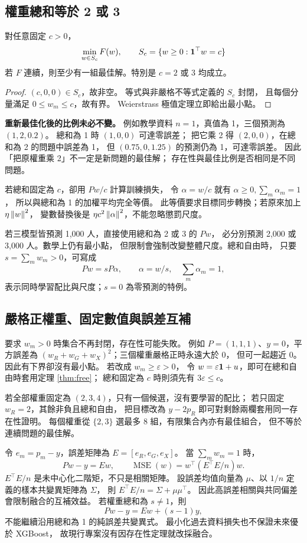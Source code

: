 \subsection{權重總和等於 2 或 3}
\begin{theorem}[固定正總和的存在性]\label{thm:sum}
對任意固定 $c>0$，
\[
\min_{w\in S_c}F(w),\qquad
S_c=\{w\ge0:\mathbf 1^\top w=c\}
\]
若 $F$ 連續，則至少有一組最佳解。特別是 $c=2$ 或 $3$ 均成立。
\end{theorem}
\begin{proof}
$(c,0,0)\in S_c$，故非空。
等式與非嚴格不等式定義的 $S_c$ 封閉，
且每個分量滿足 $0\le w_m\le c$，故有界。
Weierstrass 極值定理立即給出最小點。
\end{proof}

\textbf{重新最佳化後的比例未必不變。}
例如教學資料 $n=1$，真值為 1，三個預測為 $(1,2,0.2)$。
總和為 1 時 $(1,0,0)$ 可達零誤差；
把它乘 2 得 $(2,0,0)$，在總和為 2 的問題中誤差為 1，
但 $(0.75,0,1.25)$ 的預測仍為 1，可達零誤差。
因此「把原權重乘 2」不一定是新問題的最佳解；
存在性與最佳比例是否相同是不同問題。

若總和固定為 $c$，卻用 $Pw/c$ 計算訓練損失，
令 $\alpha=w/c$ 就有 $\alpha\ge0,\sum_m\alpha_m=1$，
所以與總和為 1 的加權平均完全等價。
此等價要求目標同步轉換；若原來加上 $\eta\left\lVert w\right\rVert^2$，
變數替換後是 $\eta c^2\left\lVert\alpha\right\rVert^2$，不能忽略懲罰尺度。

若三模型皆預測 1,000 人，直接使用總和為 2 或 3 的 $Pw$，
必分別預測 2,000 或 3,000 人。數學上仍有最小點，
但限制會強制改變整體尺度。總和自由時，
只要 $s=\sum_mw_m>0$，可寫成
\[
Pw=sP\alpha,\qquad \alpha=w/s,\quad\sum_m\alpha_m=1,
\]
表示同時學習配比與尺度；$s=0$ 為零預測的特例。

\subsection{嚴格正權重、固定數值與誤差互補}
要求 $w_m>0$ 時集合不再封閉，存在性可能失敗。
例如 $P=(1,1,1)$、$y=0$，平方誤差為
$(w_R+w_G+w_X)^2$；三個權重嚴格正時永遠大於 0，
但可一起趨近 0。因此有下界卻沒有最小點。
若改成 $w_m\ge\varepsilon>0$，
令 $w=\varepsilon\mathbf 1+u$，即可在總和自由時套用定理 \ref{thm:free}；
總和固定為 $c$ 時則須先有 $3\varepsilon\le c$。

若全部權重固定為 $(2,3,4)$，只有一個候選，沒有要學習的配比；
若只固定 $w_R=2$，其餘非負且總和自由，
把目標改為 $y-2p_R$ 即可對剩餘兩欄套用同一存在性證明。
每個權重從 $\{2,3\}$ 選最多 8 組，有限集合內亦有最佳組合，
但不等於連續問題的最佳解。

令 $e_m=p_m-y$，誤差矩陣為 $E=[e_R,e_G,e_X]$。
當 $\sum_mw_m=1$ 時，
\begin{equation}
Pw-y=Ew,\qquad
\operatorname{MSE}(w)=w^\top(E^\top E/n)w .
\end{equation}
$E^\top E/n$ 是未中心化二階矩，不只是相關矩陣。
設誤差均值向量為 $\mu$、以 $1/n$ 定義的樣本共變異矩陣為 $\Sigma$，
則 $E^\top E/n=\Sigma+\mu\mu^\top$。
因此高誤差相關與共同偏差會限制融合的互補效益。
若權重總和為 $s\ne1$，則
\[
Pw-y=Ew+(s-1)y,
\]
不能繼續沿用總和為 1 的純誤差共變異式。
最小化過去資料損失也不保證未來優於 XGBoost，
故現行專案沒有因存在性定理就改採融合。
